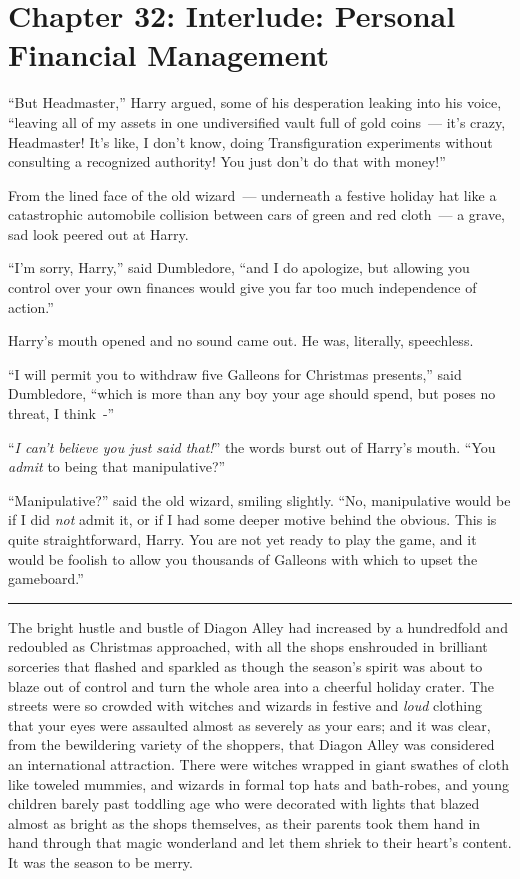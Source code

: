 \chapter{Chapter 32: Interlude: Personal Financial Management}
``But Headmaster,'' Harry argued, some of his desperation leaking into his voice, ``leaving all of my assets in one undiversified vault full of gold coins~--- it's crazy, Headmaster! It's like, I don't know, doing Transfiguration experiments without consulting a recognized authority! You just don't do that with money!''

From the lined face of the old wizard~--- underneath a festive holiday hat like a catastrophic automobile collision between cars of green and red cloth~--- a grave, sad look peered out at Harry.

``I'm sorry, Harry,'' said Dumbledore, ``and I do apologize, but allowing you control over your own finances would give you far too much independence of action.''

Harry's mouth opened and no sound came out. He was, literally, speechless.

``I will permit you to withdraw five Galleons for Christmas presents,'' said Dumbledore, ``which is more than any boy your age should spend, but poses no threat, I think~-''

``\emph{I can't believe you just said that!}'' the words burst out of Harry's mouth. ``You \emph{admit} to being that manipulative?''

``Manipulative?'' said the old wizard, smiling slightly. ``No, manipulative would be if I did \emph{not} admit it, or if I had some deeper motive behind the obvious. This is quite straightforward, Harry. You are not yet ready to play the game, and it would be foolish to allow you thousands of Galleons with which to upset the gameboard.''

\begin{center}\rule{3in}{0.4pt}\end{center}

The bright hustle and bustle of Diagon Alley had increased by a hundredfold and redoubled as Christmas approached, with all the shops enshrouded in brilliant sorceries that flashed and sparkled as though the season's spirit was about to blaze out of control and turn the whole area into a cheerful holiday crater. The streets were so crowded with witches and wizards in festive and \emph{loud} clothing that your eyes were assaulted almost as severely as your ears; and it was clear, from the bewildering variety of the shoppers, that Diagon Alley was considered an international attraction. There were witches wrapped in giant swathes of cloth like toweled mummies, and wizards in formal top hats and bath-robes, and young children barely past toddling age who were decorated with lights that blazed almost as bright as the shops themselves, as their parents took them hand in hand through that magic wonderland and let them shriek to their heart's content. It was the season to be merry.

